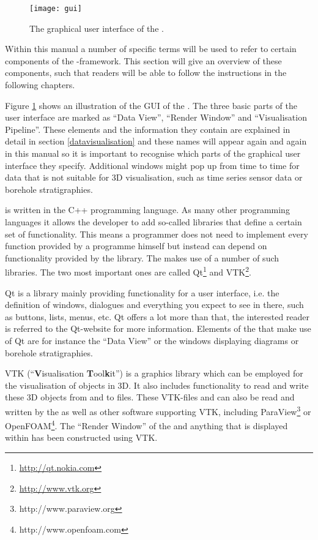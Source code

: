 \begin{figure}[tb]
\begin{center}
\texttt{[image: gui]}
\caption{The graphical user interface of the \ogsde{}.}
\label{fig:gui}
\end{center}
\end{figure}

Within this manual a number of specific terms will be used to refer to certain components of the \ogsde{}-framework. This section will give an overview of these components, such that readers will be able to follow the instructions in the following chapters.

Figure \ref{fig:gui} shows an illustration of the GUI of the \ogsde{}. The three basic parts of the user interface are marked as ``Data View'', ``Render Window'' and ``Visualisation Pipeline''. These elements and the information they contain are explained in detail in section \ref{datavisualisation} and these names will appear again and again in this manual so it is important to recognise which parts of the graphical user interface they specify. Additional windows might pop up from time to time for data that is not suitable for 3D visualisation, such as time series sensor data or borehole stratigraphies.

\ogs is written in the C++ programming language. As many other programming languages it allows the developer to add so-called libraries that define a certain set of functionality. This means a programmer does not need to implement every function provided by a programme himself but instead can depend on functionality provided by the library. The \de{} makes use of a number of such libraries. The two most important ones are called Qt\footnote{\url{http://qt.nokia.com}} and VTK\footnote{\url{http://www.vtk.org}}.

Qt is a library mainly providing functionality for a user interface, i.e. the definition of windows, dialogues and everything you expect to see in there, such as buttons, lists, menus, etc. Qt offers a lot more than that, the interested reader is referred to the Qt-website for more information. Elements of the \ogsde{} that make use of Qt are for instance the ``Data View'' or the windows displaying diagrams or borehole stratigraphies.

VTK (``\textbf{V}isualisation \textbf{T}ool\textbf{k}it'') is a graphics library which can be employed for the visualisation of objects in 3D. It also includes functionality to read and write these 3D objects from and to files. These VTK-files and can also be read and written by the \ogsde{} as well as other software supporting VTK, including ParaView\footnote{http://www.paraview.org} or OpenFOAM\footnote{http://www.openfoam.com}. The ``Render Window'' of the \de{} and anything that is displayed within has been constructed using VTK.


